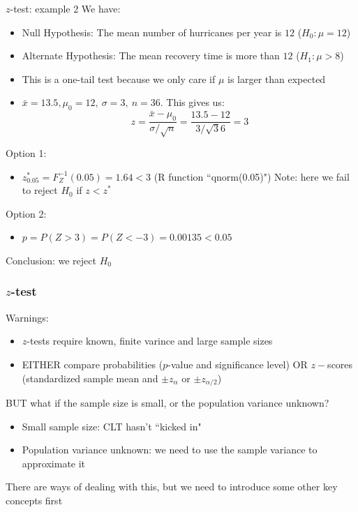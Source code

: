 \documentclass[t,8pt]{beamer}%
\begin{document}
\begin{frame}{$z$-test: example 2}
We have:
    \begin{itemize}
        \item Null Hypothesis: The mean number of hurricanes per year is $12$ ($H_0:\mu=12$)
        \item Alternate Hypothesis: The mean recovery time is more than $12$ ($H_1:\mu>8$)
        \item This is a one-tail test because we only care if $\mu$ is larger than expected
        \item $\bar x=13.5, \mu_0=12,\ \sigma=3,\ n=36$. This gives us:
        $$z=\frac{\bar x-\mu_0}{\sigma/\sqrt n}=\frac{13.5-12}{3/\sqrt 36}=3$$
    \end{itemize}
    Option 1:
    \begin{itemize}
        \item $z^*_{0.05}=F_Z^{-1}(0.05)=1.64<3$ (R function ``qnorm(0.05)")
        Note: here we fail to reject $H_0$ if $z<z^*$
    \end{itemize}
    Option 2:
    \begin{itemize}
        \item $p=P(Z>3)=P(Z<-3)=0.00135<0.05$
    \end{itemize}
    Conclusion: we reject $H_0$
\end{frame}

\begin{frame}
	\frametitle{$z$-test}
        Warnings:
        \begin{itemize}
            \item $z$-tests require known, finite varince and large sample sizes
            \item EITHER compare probabilities ($p$-value and significance level) OR $z-$scores (standardized sample mean and $\pm z_{\alpha}$ or $\pm z_{\alpha/2}$) \par
        \end{itemize}
	BUT what if the sample size is small, or the population variance unknown?
	\begin{itemize}
		\item Small sample size: CLT hasn't ``kicked in"
		\item Population variance unknown: we need to use the sample variance to approximate it
	\end{itemize}
    There are ways of dealing with this, but we need to introduce some other key concepts first
\end{frame}
\end{document}
